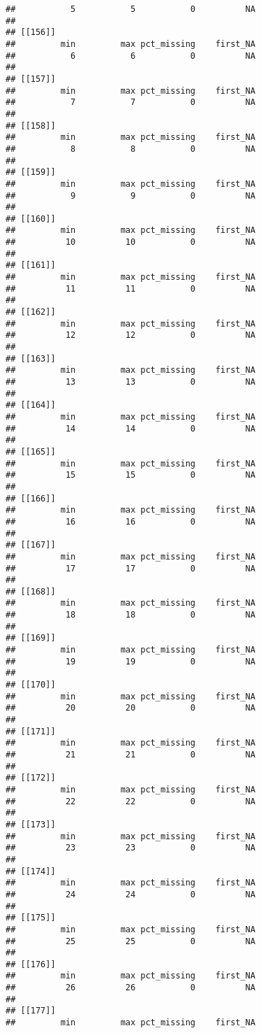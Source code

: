 \documentclass[
]{article}
\begin{document}
\begin{verbatim}
##           5           5           0          NA 
## 
## [[156]]
##         min         max pct_missing    first_NA 
##           6           6           0          NA 
## 
## [[157]]
##         min         max pct_missing    first_NA 
##           7           7           0          NA 
## 
## [[158]]
##         min         max pct_missing    first_NA 
##           8           8           0          NA 
## 
## [[159]]
##         min         max pct_missing    first_NA 
##           9           9           0          NA 
## 
## [[160]]
##         min         max pct_missing    first_NA 
##          10          10           0          NA 
## 
## [[161]]
##         min         max pct_missing    first_NA 
##          11          11           0          NA 
## 
## [[162]]
##         min         max pct_missing    first_NA 
##          12          12           0          NA 
## 
## [[163]]
##         min         max pct_missing    first_NA 
##          13          13           0          NA 
## 
## [[164]]
##         min         max pct_missing    first_NA 
##          14          14           0          NA 
## 
## [[165]]
##         min         max pct_missing    first_NA 
##          15          15           0          NA 
## 
## [[166]]
##         min         max pct_missing    first_NA 
##          16          16           0          NA 
## 
## [[167]]
##         min         max pct_missing    first_NA 
##          17          17           0          NA 
## 
## [[168]]
##         min         max pct_missing    first_NA 
##          18          18           0          NA 
## 
## [[169]]
##         min         max pct_missing    first_NA 
##          19          19           0          NA 
## 
## [[170]]
##         min         max pct_missing    first_NA 
##          20          20           0          NA 
## 
## [[171]]
##         min         max pct_missing    first_NA 
##          21          21           0          NA 
## 
## [[172]]
##         min         max pct_missing    first_NA 
##          22          22           0          NA 
## 
## [[173]]
##         min         max pct_missing    first_NA 
##          23          23           0          NA 
## 
## [[174]]
##         min         max pct_missing    first_NA 
##          24          24           0          NA 
## 
## [[175]]
##         min         max pct_missing    first_NA 
##          25          25           0          NA 
## 
## [[176]]
##         min         max pct_missing    first_NA 
##          26          26           0          NA 
## 
## [[177]]
##         min         max pct_missing    first_NA 

\end{verbatim}
\end{document}
